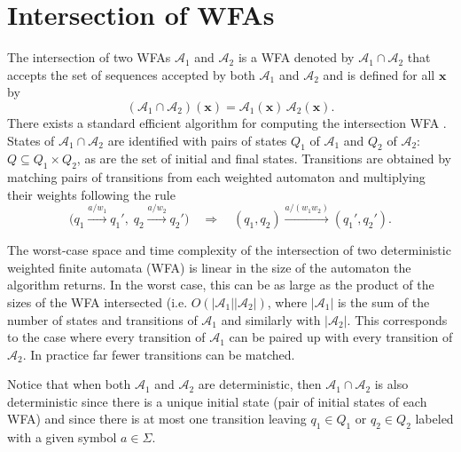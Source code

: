 \documentclass{article}
\newcommand{\sA}{\mathscr A}
\newcommand{\bx}{{\mathbf x}}
\newcommand{\cO}{O}
\begin{document}
% 

\newpage
 

\newpage
\appendix
\onecolumn

\section{Intersection of WFAs}
\label{app:intersection}

The intersection of two WFAs $\sA_1$ and $\sA_2$ is a WFA denoted by
$\sA_1 \cap \sA_2$ that accepts the set of sequences accepted by both
$\sA_1$ and $\sA_2$ and is defined for all $\bx$ by
\begin{equation*}
(\sA_1 \cap \sA_2)(\bx) = \sA_1(\bx) \, \sA_2(\bx).
\end{equation*}
There exists a standard efficient algorithm for computing the
intersection WFA \citep{Mohri2009}. States of $\sA_1 \cap \sA_2$ are
identified with pairs of states $Q_1$ of $\sA_1$ and $Q_2$ of $\sA_2$:
$Q \subseteq Q_1 \times Q_2$, as are the set of initial and final
states. Transitions are obtained by matching pairs of transitions from
each weighted automaton and multiplying their weights following the
rule
\begin{equation*}
\Big(q_1 \stackrel{a/w_1}{\longrightarrow} q_1', \; q_2 \stackrel{a/w_2}{\longrightarrow} q_2' \Big)
\quad \Rightarrow  \quad (q_1, q_2) \stackrel{a/(w_1
  w_2)}{\longrightarrow} (q_1', q_2').
\end{equation*}

The worst-case space and time complexity of the intersection of two
deterministic weighted finite automata (WFA) is linear in the size of the automaton the algorithm
returns. In the worst case, this can be as large as the product of the sizes
of the WFA intersected (i.e. $\cO(|\sA_1| |\sA_2|)$, where $|\sA_1|$ is the
sum of the number of states and transitions of $\sA_1$ and similarly with
$|\sA_2|$.  This corresponds to the case where every transition
of $\sA_1$ can be paired up with every transition of $\sA_2$. In 
practice far fewer transitions can be matched.

Notice that when both $\sA_1$ and $\sA_2$ are deterministic,
then $\sA_1 \cap \sA_2$ is also deterministic since there
is a unique initial state (pair of initial states of each WFA)
and since there is at most one transition leaving $q_1 \in Q_1$
or $q_2 \in Q_2$ labeled with a given symbol $a \in \Sigma$.
\end{document}
